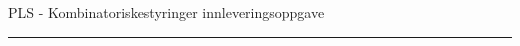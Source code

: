 \centerline{PLS - Kombinatoriskestyringer innleveringsoppgave}  \bigskip


\bigskip 
 
\hrule

\vfil \eject

